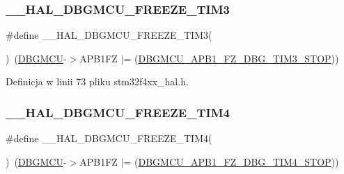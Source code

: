 \subsubsection{\texorpdfstring{\+\_\+\+\_\+\+H\+A\+L\+\_\+\+D\+B\+G\+M\+C\+U\+\_\+\+F\+R\+E\+E\+Z\+E\+\_\+\+T\+I\+M3}{\_\_HAL\_DBGMCU\_FREEZE\_TIM3}}
{\footnotesize\ttfamily \#define \+\_\+\+\_\+\+H\+A\+L\+\_\+\+D\+B\+G\+M\+C\+U\+\_\+\+F\+R\+E\+E\+Z\+E\+\_\+\+T\+I\+M3(\begin{DoxyParamCaption}{ }\end{DoxyParamCaption})~(\hyperlink{group___peripheral__declaration_ga92ec6d9ec2251fda7d4ce09748cd74b4}{D\+B\+G\+M\+CU}-\/$>$A\+P\+B1\+FZ $\vert$= (\hyperlink{group___peripheral___registers___bits___definition_ga2fea6834f4ef9fc6b403cd079a001cec}{D\+B\+G\+M\+C\+U\+\_\+\+A\+P\+B1\+\_\+\+F\+Z\+\_\+\+D\+B\+G\+\_\+\+T\+I\+M3\+\_\+\+S\+T\+OP}))}



Definicja w linii 73 pliku stm32f4xx\+\_\+hal.\+h.

\mbox{\label{group___h_a_l___exported___macros_ga9ec45e12bbea210d8ec91d9cdd9f911c}} 
\subsubsection{\texorpdfstring{\+\_\+\+\_\+\+H\+A\+L\+\_\+\+D\+B\+G\+M\+C\+U\+\_\+\+F\+R\+E\+E\+Z\+E\+\_\+\+T\+I\+M4}{\_\_HAL\_DBGMCU\_FREEZE\_TIM4}}
{\footnotesize\ttfamily \#define \+\_\+\+\_\+\+H\+A\+L\+\_\+\+D\+B\+G\+M\+C\+U\+\_\+\+F\+R\+E\+E\+Z\+E\+\_\+\+T\+I\+M4(\begin{DoxyParamCaption}{ }\end{DoxyParamCaption})~(\hyperlink{group___peripheral__declaration_ga92ec6d9ec2251fda7d4ce09748cd74b4}{D\+B\+G\+M\+CU}-\/$>$A\+P\+B1\+FZ $\vert$= (\hyperlink{group___peripheral___registers___bits___definition_ga7ac65bf9342bb8acbcb25938e93abc45}{D\+B\+G\+M\+C\+U\+\_\+\+A\+P\+B1\+\_\+\+F\+Z\+\_\+\+D\+B\+G\+\_\+\+T\+I\+M4\+\_\+\+S\+T\+OP}))}



